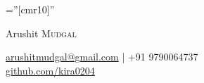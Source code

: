 \documentclass[a4paper,1pt]{article}
\begin{document}

\pagestyle{empty} %

\font\fb=''[cmr10]'' %

\par{\centering
		{\Huge Arushit \textsc{Mudgal}
		
	}\href{mailto:arushitmudgal@gmail.com}{arushitmudgal@gmail.com} | +91 9790064737\\
	\href{https://github.com/kira0204}{github.com/kira0204}\bigskip\par}

%

\end{document}
